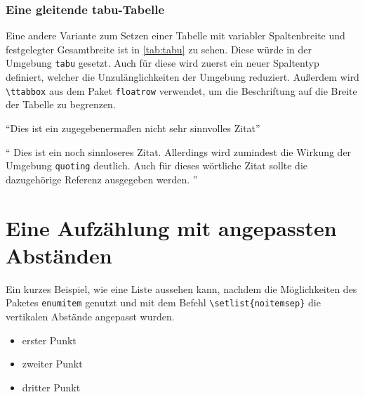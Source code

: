 \documentclass[english,ngerman]{tudscrreprt}
\begin{document}
\subsubsection{Eine gleitende tabu-Tabelle}
Eine andere Variante zum Setzen einer Tabelle mit variabler Spaltenbreite
und festgelegter Gesamtbreite ist in \autoref{tab:tabu} zu sehen. Diese
würde in der Umgebung \texttt{tabu} gesetzt. Auch für diese wird zuerst
ein neuer Spaltentyp definiert, welcher die Unzulänglichkeiten der
Umgebung reduziert. Außerdem wird \texttt{\textbackslash ttabbox} aus dem
Paket \texttt{floatrow} verwendet, um die Beschriftung auf die Breite der
Tabelle zu begrenzen.
\makeatletter
\newcolumntype{Z}{}
\renewcommand*\NC@rewrite@Z[1][]{%
\NC@find>{\hspace{0pt}}X[#1]<{\@finalstrut\@arstrutbox}%
}
\makeatother
\begin{table}
\end{table}
\enquote{Dies ist ein zugegebenermaßen nicht sehr sinnvolles Zitat}
\cite[58]{hanisch14}
\begin{quoting}
\enquote{%
Dies ist ein noch sinnloseres Zitat. Allerdings wird zumindest die
Wirkung der Umgebung \texttt{quoting} deutlich. Auch für dieses
wörtliche Zitat sollte die dazugehörige Referenz ausgegeben werden.%
}
\cite[12]{hanisch14}
\end{quoting}
\section{Eine Aufzählung mit angepassten Abständen}
Ein kurzes Beispiel, wie eine Liste aussehen kann, nachdem die
Möglichkeiten des Paketes \texttt{enumitem} genutzt und mit dem
Befehl \texttt{\textbackslash setlist\{noitemsep\}} die vertikalen
Abstände angepasst wurden.
\begin{itemize}
\item erster Punkt
\item zweiter Punkt
\item dritter Punkt
\end{itemize}
\printbibliography\label{sec:bibliography}
\end{document}
